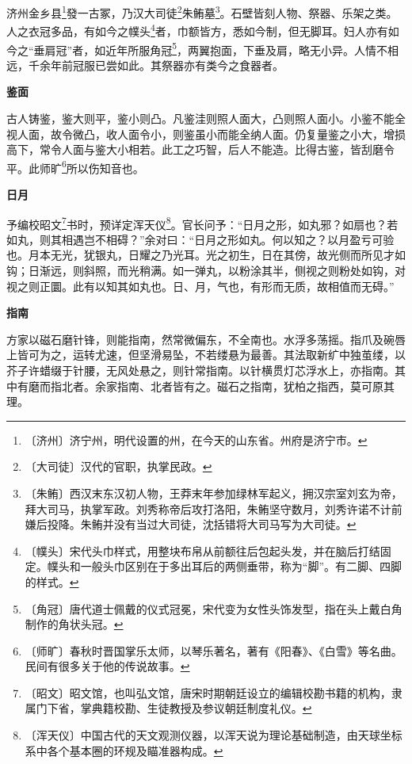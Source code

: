 \documentclass[12pt,UTF-8,openany,a4]{ctexbook}
\begin{document}
\begin{large}
    济州金乡县\footnote{〔济州〕\yiwen 济宁州，明代设置的州，在今天的山东省。州府是济宁市。}發一古冢，乃汉大司徒\footnote{〔大司徒〕\yiwen 汉代的官职，执掌民政。}朱鲔墓\footnote{〔朱鲔〕\yiwen 西汉末东汉初人物，王莽末年参加绿林军起义，拥汉宗室刘玄为帝，拜大司马，执掌军政。刘秀称帝后攻打洛阳，朱鲔坚守数月，刘秀许诺不计前嫌后投降。朱鲔并没有当过大司徒，沈括错将大司马写为大司徒。}。石壁皆刻人物、祭器、乐架之类。人之衣冠多品，有如今之幞头\footnote{〔幞头〕\yiwen 宋代头巾样式，用整块布帛从前额往后包起头发，并在脑后打结固定。幞头和一般头巾区别在于多出耳后的两侧垂带，称为“脚”。有二脚、四脚的样式。}者，巾额皆方，悉如今制，但无脚耳。妇人亦有如今之“垂肩冠”者，如近年所服角冠\footnote{〔角冠〕\yiwen 唐代道士佩戴的仪式冠冕，宋代变为女性头饰发型，指在头上戴白角制作的角状头冠。}，两翼抱面，下垂及肩，略无小异。人情不相远，千余年前冠服已尝如此。其祭器亦有类今之食器者。
    
    \begin{center}{\Large\textbf{鉴面}}\end{center}
    
    古人铸鉴，鉴大则平，鉴小则凸。凡鉴洼则照人面大，凸则照人面小。小鉴不能全视人面，故令微凸，收人面令小，则鉴虽小而能全纳人面。仍复量鉴之小大，增损高下，常令人面与鉴大小相若。此工之巧智，后人不能造。比得古鉴，皆刮磨令平。此师旷\footnote{〔师旷〕\yiwen 春秋时晋国掌乐太师，以琴乐著名，著有《阳春》、《白雪》等名曲。民间有很多关于他的传说故事。}所以伤知音也。
    
    \begin{center}{\Large\textbf{日月}}\end{center}
    
    予编校昭文\footnote{〔昭文〕\yiwen 昭文馆，也叫弘文馆，唐宋时期朝廷设立的编辑校勘书籍的机构，隶属门下省，掌典籍校勘、生徒教授及参议朝廷制度礼仪。}书时，预详定浑天仪\footnote{〔浑天仪〕\yiwen 中国古代的天文观测仪器，以浑天说为理论基础制造，由天球坐标系中各个基本圈的环规及瞄准器构成。}。官长问予：“日月之形，如丸邪？如扇也？若如丸，则其相遇岂不相碍？”余对曰：“日月之形如丸。何以知之？以月盈亏可验也。月本无光，犹银丸，日耀之乃光耳。光之初生，日在其傍，故光侧而所见才如钩；日渐远，则斜照，而光稍满。如一弹丸，以粉涂其半，侧视之则粉处如钩，对视之则正圜。此有以知其如丸也。日、月，气也，有形而无质，故相值而无碍。”
    
    \begin{center}{\Large\textbf{指南}}\end{center}
    
    方家以磁石磨针锋，则能指南，然常微偏东，不全南也。水浮多荡摇。指爪及碗唇上皆可为之，运转尤速，但坚滑易坠，不若缕悬为最善。其法取新纩中独茧缕，以芥子许蜡缀于针腰，无风处悬之，则针常指南。以针横贯灯芯浮水上，亦指南。其中有磨而指北者。余家指南、北者皆有之。磁石之指南，犹柏之指西，莫可原其理。
    

\end{large}
\end{document}
